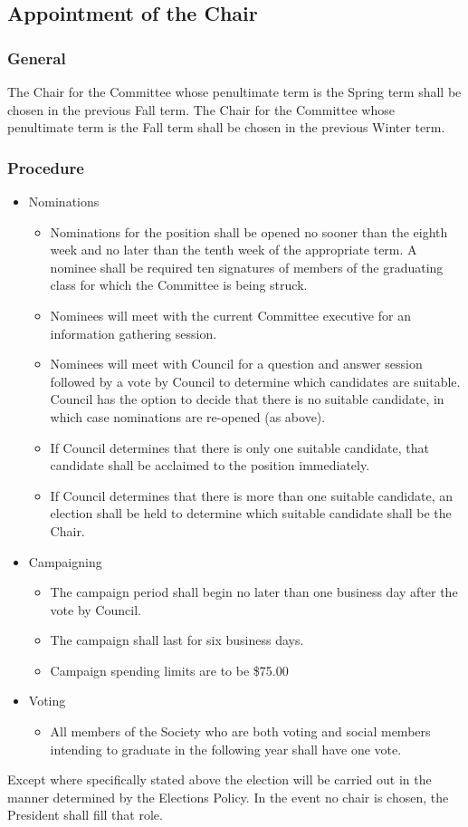 \subsection{Appointment of the Chair}
\subsubsection{General}
The Chair for the Committee whose penultimate term is the Spring term shall be chosen in the previous Fall term.
The Chair for the Committee whose penultimate term is the Fall term shall be chosen in the previous Winter term.
\subsubsection{Procedure}
\begin{itemize}
\item Nominations
	\begin{itemize}
	\item Nominations for the position shall be opened no sooner than the eighth week and no later than the tenth week of the appropriate term. A nominee shall be required ten signatures of members of the graduating class for which the Committee is being struck.
	\item Nominees will meet with the current Committee executive for an information gathering session.
	\item Nominees will meet with Council for a question and answer session followed by a vote by Council to determine which candidates are suitable. Council has the option to decide that there is no suitable candidate, in which case nominations are re-opened (as above).
	\item If Council determines that there is only one suitable candidate, that candidate shall be acclaimed to the position immediately.
	\item If Council determines that there is more than one suitable candidate, an election shall be held to determine which suitable candidate shall be the Chair.
	\end{itemize}
\item Campaigning
	\begin{itemize}
	\item The campaign period shall begin no later than one business day after the vote by Council.
	\item The campaign shall last for six business days.
	\item Campaign spending limits are to be \$75.00
	\end{itemize}
\item Voting
	\begin{itemize}
	\item All members of the Society who are both voting and social members intending to graduate in the following year shall have one vote.
	\end{itemize}
\end{itemize}
Except where specifically stated above the election will be carried out in the manner determined by the Elections Policy.
In the event no chair is chosen, the President shall fill that role.